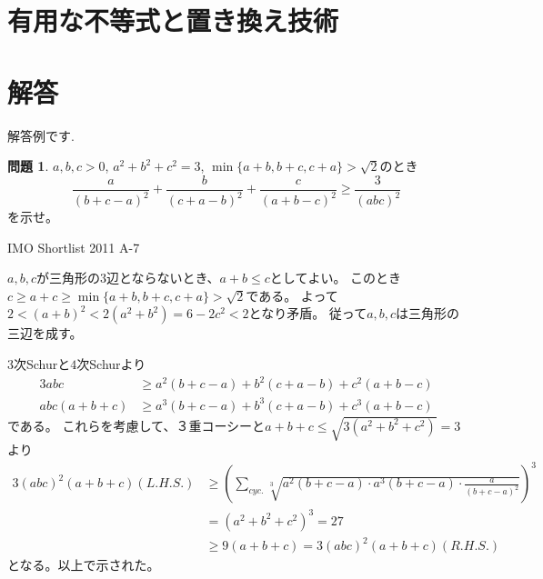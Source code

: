 \documentclass[uplatex, a5paper]{jsarticle}
\makeatletter
\theoremstyle{definition}
\newtheorem{prob}{問題}
\renewenvironment{proof}[1][\proofname]{
  \pushQED{\qed}%
  \normalfont \topsep6\p@\@plus6\p@\relax
  \trivlist
  \item[\hskip\labelsep
    #1\@addpunct{\textbf{.}}]\ignorespaces
}{%
  \popQED\endtrivlist\@endpefalse
}
\providecommand{\proofname}{証明}
\def\qed{\hfill $\Box$}
\makeatother
\begin{document}
\section{有用な不等式と置き換え技術}





\newpage

\section{解答}


解答例です.


\newpage

\begin{prob}
  \(a,b,c>0\), \(a^2+b^2+c^2=3\), \(\min \{ a+b,b+c,c+a \} > \sqrt{2}\)のとき
  \[
  \frac{a}{(b+c-a)^2}+\frac{b}{(c+a-b)^2}+\frac{c}{(a+b-c)^2}\geq\frac{3}{(abc)^2}
  \]
  を示せ。
  \begin{flushright}
    IMO Shortlist 2011 A-7
  \end{flushright}
\end{prob}


\begin{proof}
  \(a,b,c\)が三角形の\(3\)辺とならないとき、\(a+b\leq c\)としてよい。
  このとき\(c \geq a+c \geq \min \{ a+b,b+c,c+a \} > \sqrt{2} \)である。
  よって\(2< (a+b)^2 < 2(a^2+b^2) = 6 - 2c^2 < 2\)となり矛盾。
  従って\(a,b,c\)は三角形の三辺を成す。

  \(3\)次Schurと\(4\)次Schurより
  \begin{align*}
    3abc &\geq a^2(b+c-a) + b^2( c+a -b) + c^2( a+b-c) \\
    abc(a+b+c) &\geq a^3(b+c-a) + b^3(c+a-b) + c^3(a+b-c)
  \end{align*}
  である。
  これらを考慮して、３重コーシーと\(a+b+c \leq \sqrt{3(a^2+b^2+c^2)} = 3\)より
  \begin{align*}
    3(abc)^2(a+b+c)(L.H.S.) &\geq
    \left( \sum_{cyc.} \sqrt[3]{a^2(b+c-a)\cdot a^3(b+c-a) \cdot \frac{a}{(b+c-a)^2} } \right)^3 \\
    &= (a^2+b^2+c^2)^3 = 27  \\
    &\geq 9 (a+b+c) = 3(abc)^2(a+b+c)(R.H.S.)
  \end{align*}
  となる。以上で示された。
\end{proof}







\newpage
\end{document}
